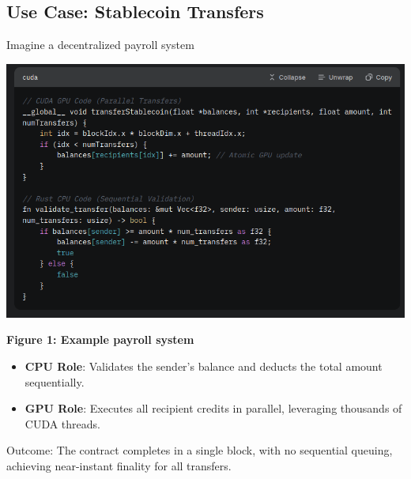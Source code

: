 \documentclass[12pt]{article}
\begin{document}
\subsection{Use Case: Stablecoin Transfers}
\begin{justify}
Imagine a decentralized payroll system

\vspace{1cm}
\noindent\centering
\includegraphics[width=1\textwidth]{code.png}

\noindent
\textbf{Figure 1: Example payroll system}

\begin{itemize}
    \item \textbf{CPU Role}: Validates the sender’s balance and deducts the total amount sequentially.
    \item \textbf{GPU Role}: Executes all recipient credits in parallel, leveraging thousands of CUDA threads.

\end{itemize}
Outcome: The contract completes in a single block, with no sequential queuing, achieving near-instant finality for all transfers.
\end{justify}
\end{document}
